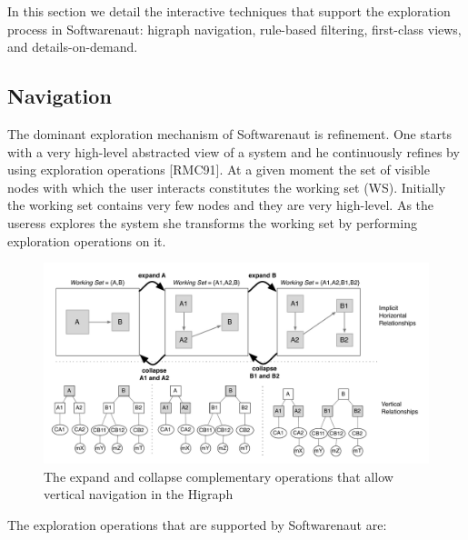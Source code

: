 \documentclass[preprint,12pt]{elsarticle}
\begin{document}
In this section we detail the interactive techniques that support the exploration process in Softwarenaut: higraph navigation, rule-based filtering, first-class views, and details-on-demand.  

\subsection{Navigation}
The dominant exploration mechanism of Softwarenaut is refinement. One starts with a very high-level abstracted view of a system and he continuously refines by using exploration operations [RMC91]. At a given moment the set of visible nodes with which the user interacts constitutes the working set (WS). Initially the working set contains very few nodes and they are very high-level. As the useress explores the system she transforms the working set by performing exploration operations on it. 


\begin{figure}[b!]
\begin{center}
\includegraphics[width=\linewidth]{images/SnautSequence}
\caption{The expand and collapse complementary operations that allow vertical navigation in the Higraph}
\label{}
\end{center}
\end{figure}

The exploration operations that are supported by Softwarenaut are:
\end{document}
